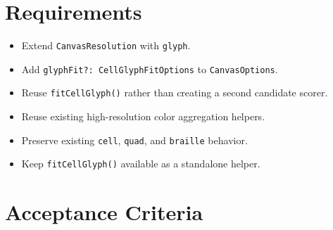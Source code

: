\section{Requirements}\label{record-162-requirements}

\begin{itemize}
\tightlist
\item
  Extend \texttt{C\allowbreak{}a\allowbreak{}n\allowbreak{}v\allowbreak{}a\allowbreak{}s\allowbreak{}R\allowbreak{}e\allowbreak{}s\allowbreak{}o\allowbreak{}l\allowbreak{}u\allowbreak{}t\allowbreak{}i\allowbreak{}o\allowbreak{}n} with \texttt{g\allowbreak{}l\allowbreak{}y\allowbreak{}p\allowbreak{}h}.
\item
  Add \texttt{g\allowbreak{}l\allowbreak{}y\allowbreak{}p\allowbreak{}h\allowbreak{}F\allowbreak{}i\allowbreak{}t\allowbreak{}?\allowbreak{}:\allowbreak{} \allowbreak{}C\allowbreak{}e\allowbreak{}l\allowbreak{}l\allowbreak{}G\allowbreak{}l\allowbreak{}y\allowbreak{}p\allowbreak{}h\allowbreak{}F\allowbreak{}i\allowbreak{}t\allowbreak{}O\allowbreak{}p\allowbreak{}t\allowbreak{}i\allowbreak{}o\allowbreak{}n\allowbreak{}s} to \texttt{C\allowbreak{}a\allowbreak{}n\allowbreak{}v\allowbreak{}a\allowbreak{}s\allowbreak{}O\allowbreak{}p\allowbreak{}t\allowbreak{}i\allowbreak{}o\allowbreak{}n\allowbreak{}s}.
\item
  Reuse \texttt{f\allowbreak{}i\allowbreak{}t\allowbreak{}C\allowbreak{}e\allowbreak{}l\allowbreak{}l\allowbreak{}G\allowbreak{}l\allowbreak{}y\allowbreak{}p\allowbreak{}h\allowbreak{}(\allowbreak{})} rather than creating a second candidate scorer.
\item
  Reuse existing high-resolution color aggregation helpers.
\item
  Preserve existing \texttt{c\allowbreak{}e\allowbreak{}l\allowbreak{}l}, \texttt{q\allowbreak{}u\allowbreak{}a\allowbreak{}d}, and \texttt{b\allowbreak{}r\allowbreak{}a\allowbreak{}i\allowbreak{}l\allowbreak{}l\allowbreak{}e} behavior.
\item
  Keep \texttt{f\allowbreak{}i\allowbreak{}t\allowbreak{}C\allowbreak{}e\allowbreak{}l\allowbreak{}l\allowbreak{}G\allowbreak{}l\allowbreak{}y\allowbreak{}p\allowbreak{}h\allowbreak{}(\allowbreak{})} available as a standalone helper.
\end{itemize}

\section{Acceptance Criteria}\label{record-162-acceptance-criteria}

